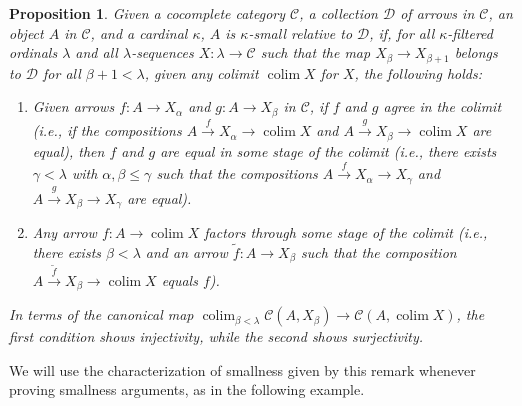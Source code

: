\documentclass{amsart}
\theoremstyle{plain}
\newtheorem{proposition}[theorem]{Proposition}
\theoremstyle{definition}
\newcommand{\wt}{\widetilde}
\newcommand{\0}{\mathbf{0}}
\newcommand{\cC}{\mathcal C}
\newcommand{\cD}{\mathcal D}
\renewcommand{\(}{\left(}
\renewcommand{\)}{\right)}
\DeclareMathOperator*{\colim}{colim}
\begin{document}
\begin{proposition}\label{nicer_description_of_smallness_conditions}
  Given a cocomplete category $\cC$, a collection $\cD$ of arrows in $\cC$, an object $A$ in $\cC$, and a cardinal $\kappa$, $A$ is $\kappa$-small relative to $\cD$, if, for all $\kappa$-filtered ordinals $\lambda$ and all $\lambda$-sequences $X:\lambda\to\cC$ such that the map $X_{\beta}\to X_{\beta+1}$ belongs to $\cD$ for all $\beta+1<\lambda$, given any colimit $\colim X$ for $X$, the following holds:
  \begin{enumerate}[label=(\roman*)]
    \item Given arrows $f:A\to X_\alpha$ and $g:A\to X_{\beta}$ in $\cC$, if $f$ and $g$ agree in the colimit (i.e., if the compositions $A\xrightarrow{f} X_\alpha\to\colim X$ and $A\xrightarrow{g} X_{\beta}\to \colim X$ are equal), then $f$ and $g$ are equal in some stage of the colimit (i.e., there exists $\gamma<\lambda$ with $\alpha,\beta\leq\gamma$ such that the compositions $A\xrightarrow{f} X_\alpha\to X_\gamma$ and $A\xrightarrow{g} X_{\beta}\to X_{\gamma}$ are equal).
    \item Any arrow $f:A\to\colim X$ factors through some stage of the colimit (i.e., there exists $\beta<\lambda$ and an arrow $\wt f:A\to X_\beta$ such that the composition $A\xrightarrow{\wt f}X_\beta\to\colim X$ equals $f$).
  \end{enumerate}
  In terms of the canonical map $\colim_{\beta<\lambda}\cC(A,X_\beta)\to\cC(A,\colim X)$, the first condition shows injectivity, while the second shows surjectivity.
\end{proposition}

We will use the characterization of smallness given by this remark whenever proving smallness arguments, as in the following example.
\end{document}
